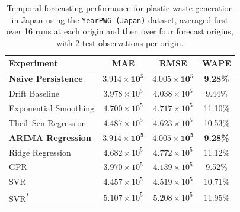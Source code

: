 \begin{table}[!ht]
	\centering
	\caption{\centering Temporal forecasting performance for plastic waste generation in Japan using the \texttt{YearPWG (Japan)} dataset, averaged first over 16 runs at each origin and then over four forecast origins, with 2 test observations per origin.}
	\begin{tabular}{@{}lccc@{}}
		\toprule
		\textbf{Experiment}    & \textbf{MAE}                   & \textbf{RMSE}                  & \textbf{WAPE}       \\
		\midrule
		\textbf{Naive Persistence} & \(\mathbf{3.914 \times 10^{5}}\) & \(\mathbf{4.005 \times 10^{5}}\) & \textbf{9.28\%} \\
		Drift Baseline & \(3.978 \times 10^{5}\) & \(4.038 \times 10^{5}\) & 9.44\% \\
		Exponential Smoothing & \(4.700 \times 10^{5}\) & \(4.717 \times 10^{5}\) & 11.10\% \\
		Theil--Sen Regression & \(4.487 \times 10^{5}\) & \(4.623 \times 10^{5}\) & 10.53\% \\
		\textbf{ARIMA Regression} & \(\mathbf{3.914 \times 10^{5}}\) & \(\mathbf{4.005 \times 10^{5}}\) & \textbf{9.28\%} \\
		Ridge Regression & \(4.682 \times 10^{5}\) & \(4.772 \times 10^{5}\) & 11.12\% \\
		GPR & \(3.970 \times 10^{5}\) & \(4.139 \times 10^{5}\) & 9.52\% \\
		SVR & \(4.457 \times 10^{5}\) & \(4.519 \times 10^{5}\) & 10.71\% \\
		SVR\textsuperscript{*} & \(5.107 \times 10^{5}\) & \(5.208 \times 10^{5}\) & 11.95\% \\
		\hline
	\end{tabular}
	\label{tab:forecasting_japan_pwg_metrics}
\end{table}
